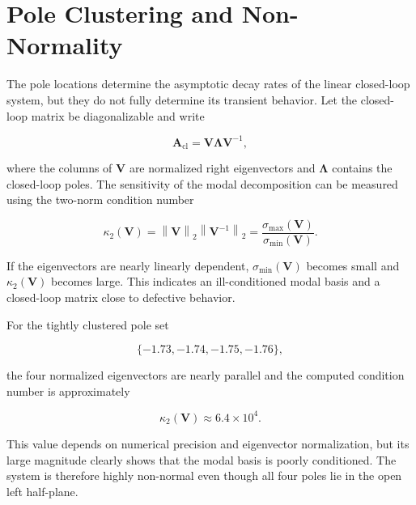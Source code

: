 \section{Pole Clustering and Non-Normality}
\label{sec:further-pole-clustering}

The pole locations determine the asymptotic decay rates of the linear
closed-loop system, but they do not fully determine its transient behavior.
Let the closed-loop matrix be diagonalizable and write

\begin{equation}
\mathbf{A}_{\mathrm{cl}}
=
\mathbf{V}\mathbf{\Lambda}\mathbf{V}^{-1},
\label{eq:closed-loop-modal-decomposition}
\end{equation}

where the columns of $\mathbf{V}$ are normalized right eigenvectors and
$\mathbf{\Lambda}$ contains the closed-loop poles. The sensitivity of the
modal decomposition can be measured using the two-norm condition number

\begin{equation}
\kappa_2(\mathbf{V})
=
\left\|\mathbf{V}\right\|_2
\left\|\mathbf{V}^{-1}\right\|_2
=
\frac{\sigma_{\max}(\mathbf{V})}
     {\sigma_{\min}(\mathbf{V})}.
\label{eq:eigenvector-condition-number}
\end{equation}

If the eigenvectors are nearly linearly dependent,
$\sigma_{\min}(\mathbf{V})$ becomes small and
$\kappa_2(\mathbf{V})$ becomes large. This indicates an ill-conditioned modal
basis and a closed-loop matrix close to defective behavior.

For the tightly clustered pole set

\begin{equation}
\{-1.73,-1.74,-1.75,-1.76\},
\end{equation}

the four normalized eigenvectors are nearly parallel and the computed
condition number is approximately

\begin{equation}
\kappa_2(\mathbf{V})
\approx
6.4\times10^4.
\label{eq:clustered-eigenvector-condition-number}
\end{equation}

This value depends on numerical precision and eigenvector normalization, but
its large magnitude clearly shows that the modal basis is poorly conditioned.
The system is therefore highly non-normal even though all four poles lie in the
open left half-plane.

